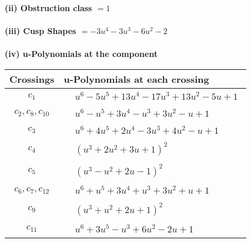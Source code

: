 \documentclass[1p]{elsarticle_modified}
\theoremstyle{definition}
\begin{document}
\flushleft \textbf{(ii) Obstruction class $= 1$}\\~\\
\flushleft \textbf{(iii) Cusp Shapes $= -3 u^4-3 u^3-6 u^2-2$}\\~\\
\newpage\renewcommand{\arraystretch}{1}
\flushleft \textbf{(iv) u-Polynomials at the component}\newline \\
\begin{tabular}{m{50pt}|m{274pt}}
Crossings & \hspace{64pt}u-Polynomials at each crossing \\
\hline $$\begin{aligned}c_{1}\end{aligned}$$&$\begin{aligned}
&u^6-5 u^5+13 u^4-17 u^3+13 u^2-5 u+1
\end{aligned}$\\
\hline $$\begin{aligned}c_{2},c_{8},c_{10}\end{aligned}$$&$\begin{aligned}
&u^6- u^5+3 u^4- u^3+3 u^2- u+1
\end{aligned}$\\
\hline $$\begin{aligned}c_{3}\end{aligned}$$&$\begin{aligned}
&u^6+4 u^5+2 u^4-3 u^3+4 u^2- u+1
\end{aligned}$\\
\hline $$\begin{aligned}c_{4}\end{aligned}$$&$\begin{aligned}
&(u^3+2 u^2+3 u+1)^2
\end{aligned}$\\
\hline $$\begin{aligned}c_{5}\end{aligned}$$&$\begin{aligned}
&(u^3- u^2+2 u-1)^2
\end{aligned}$\\
\hline $$\begin{aligned}c_{6},c_{7},c_{12}\end{aligned}$$&$\begin{aligned}
&u^6+u^5+3 u^4+u^3+3 u^2+u+1
\end{aligned}$\\
\hline $$\begin{aligned}c_{9}\end{aligned}$$&$\begin{aligned}
&(u^3+u^2+2 u+1)^2
\end{aligned}$\\
\hline $$\begin{aligned}c_{11}\end{aligned}$$&$\begin{aligned}
&u^6+3 u^5- u^3+6 u^2-2 u+1
\end{aligned}$\\
\hline
\end{tabular}\\~\\
\end{document}
